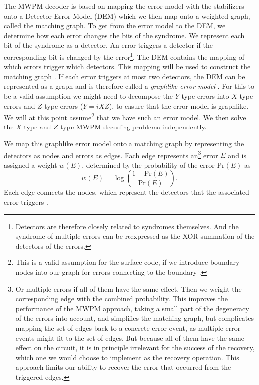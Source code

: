 The MWPM decoder is based on mapping the error model with the stabilizers onto a Detector Error Model (DEM) which we then map onto a weighted graph, called the matching graph.
To get from the error model to the DEM, we determine how each error changes the bits of the syndrome.
We represent each bit of the syndrome as a detector. 
An error triggers a detector if the corresponding bit is changed by the error\footnote{
    Detectors are therefore closely related to syndromes themselves.
    And the syndrome of multiple errors can be reexpressed as the XOR summation of the detectors of the errors.
}. 
The DEM contains the mapping of which errors trigger which detectors.
This mapping will be used to construct the matching graph \cite{pymatching,pymatching_loger_paper}.
If each error triggers at most two detectors, the DEM can be represented as a graph and is therefore called a \emph{graphlike error model} \cite{pymatching_loger_paper}.
For this to be a valid assumption we might need to decompose the $Y$-type errors into $X$-type errors and $Z$-type errors ($Y = i XZ$), to ensure that the error model is graphlike.
We will at this point assume\footnote{
    This is a valid assumption for the surface code, if we introduce boundary nodes into our graph for errors connecting to the boundary \cite{topological_quantum_memory,pymatching_loger_paper}.
    } that we have such an error model.
We then solve the $X$-type and $Z$-type MWPM decoding problems independently.

We map this graphlike error model onto a matching graph by representing the detectors as nodes and errors as edges.
Each edge represents an\footnote{
    Or multiple errors if all of them have the same effect. 
    Then we weight the corresponding edge with the combined probability.
    This improves the performance of the MWPM approach, taking a small part of the degeneracy of the errors into account, 
    and simplifies the matching graph, but complicates mapping the set of edges back to a concrete error event, 
    as multiple error events might fit to the set of edges.
    But because all of them have the same effect on the circuit, it is in principle irrelevant for the success of the recovery, 
    which one we would choose to implement as the recovery operation.  
    This approach limits our ability to recover the error that occurred from the triggered edges.
    } error $E$ and is assigned a weight $w(E)$, determined by the probability of the error $\text{Pr}(E)$ as
\begin{equation}
    w(E) = \log \left( \frac{1-\text{Pr}(E)}{\text{Pr}(E)}\right).
\end{equation}
Each edge connects the nodes, which represent the detectors that the associated error triggers \cite{pymatching,pymatching_loger_paper}. 

